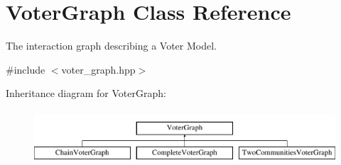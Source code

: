 \hypertarget{classVoterGraph}{\section{Voter\-Graph Class Reference}
\label{classVoterGraph}
}


The interaction graph describing a Voter Model.  




{\ttfamily \#include $<$voter\-\_\-graph.\-hpp$>$}

Inheritance diagram for Voter\-Graph\-:\begin{figure}[H]
\begin{center}
\leavevmode
\includegraphics[height=2.000000cm]{classVoterGraph}
\end{center}
\end{figure}
